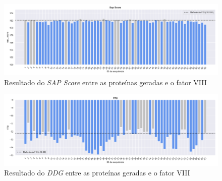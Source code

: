 \begin{figure}[H]
    \centering
    \includegraphics[width=.9\linewidth]{figuras/plot_sap_score.png}    
    \caption{Resultado do \textit{SAP Score} entre as proteínas geradas e o fator VIII}
\end{figure}

\begin{figure}[H]
    \centering
    \includegraphics[width=.9\linewidth]{figuras/plot_ddg.png}    
    \caption{Resultado do \textit{DDG} entre as proteínas geradas e o fator VIII}
\end{figure}









